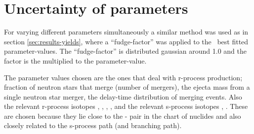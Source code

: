 \section{Uncertainty of parameters}

For varying different parameters simultaneously a similar method was used as in section \ref{sec:results-yields}, where a ``fudge-factor'' was applied to the \eris\ best fitted parameter-values. The ``fudge-factor'' is distributed gaussian around 1.0 and the factor is the multiplied to the parameter-value.

The parameter values chosen are the ones that deal with r-process production; fraction of neutron stars that merge (number of mergers), the ejecta mass from a single neutron star merger, the delay-time distribution of merging events.
Also the relevant r-process isotopes , , , , and the relevant s-process isotopes , .
These are chosen because they lie close to the - pair in the chart of nuclides and also closely related to the s-process path (and branching path).
